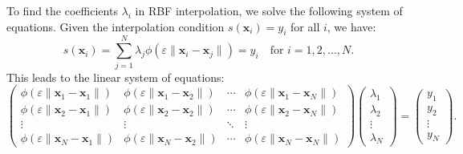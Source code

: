 \documentclass[preprint]{elsarticle}       %
\newtheorem{theorem}{Theorem}[section]
\begin{document}

To find the coefficients $\lambda_i$ in RBF interpolation, we solve the following system of equations. Given the interpolation condition $s(\mathbf{x}_i) = y_i$ for all $i$, we have:
\begin{equation}\label{interp2}
s(\mathbf{x}_i) = \sum_{j=1}^N \lambda_j \phi(\varepsilon\|\mathbf{x}_i - \mathbf{x}_j\|) = y_i \quad \text{for } i = 1, 2, \ldots, N.
\end{equation}
This leads to the linear system of equations:
$$
\begin{pmatrix}\label{sys}
\phi(\varepsilon\|\mathbf{x}_1 - \mathbf{x}_1\|) & \phi(\varepsilon\|\mathbf{x}_1 - \mathbf{x}_2\|) & \cdots & \phi(\varepsilon\|\mathbf{x}_1 - \mathbf{x}_N\|) \\
\phi(\varepsilon\|\mathbf{x}_2 - \mathbf{x}_1\|) & \phi(\varepsilon\|\mathbf{x}_2 - \mathbf{x}_2\|) & \cdots & \phi(\varepsilon\|\mathbf{x}_2 - \mathbf{x}_N\|) \\
\vdots & \vdots & \ddots & \vdots \\
\phi(\varepsilon\|\mathbf{x}_N - \mathbf{x}_1\|) & \phi(\varepsilon\|\mathbf{x}_N - \mathbf{x}_2\|) & \cdots & \phi(\varepsilon\|\mathbf{x}_N - \mathbf{x}_N\|)
\end{pmatrix}
\begin{pmatrix}
\lambda_1 \\
\lambda_2 \\
\vdots \\
\lambda_N
\end{pmatrix}
=
\begin{pmatrix}
y_1 \\
y_2 \\
\vdots \\
y_N
\end{pmatrix}.
$$


\end{document}
